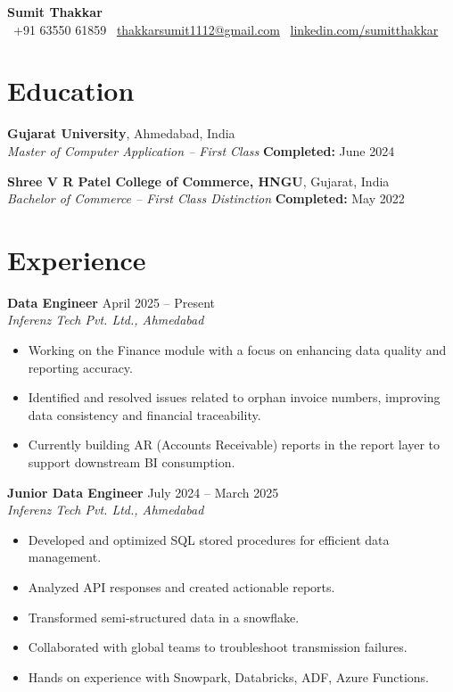 \documentclass[11pt,a4paper]{article}
\begin{document}
\justifying
\begin{center}
  {\Huge \textbf{Sumit Thakkar}}\\[8pt]
  \faPhone \ +91 63550 61859 \quad
  \faEnvelope \ \href{mailto:thakkarsumit1112@gmail.com}{thakkarsumit1112@gmail.com} \quad
  \faLinkedinSquare \ \href{https://linkedin.com/sumitthakkar}{linkedin.com/sumitthakkar}
\end{center}

\vspace{0.5cm}

\section*{Education}

\textbf{Gujarat University}, Ahmedabad, India \\
\textit{Master of Computer Application – First Class} \hfill \textbf{Completed:} June 2024

\vspace{0.3cm}

\textbf{Shree V R Patel College of Commerce, HNGU}, Gujarat, India \\
\textit{Bachelor of Commerce – First Class Distinction} \hfill \textbf{Completed:} May 2022

\vspace{0.4cm}

\section*{Experience}

\textbf{Data Engineer} \hfill April 2025 – Present \\
\textit{Inferenz Tech Pvt. Ltd., Ahmedabad} 
\begin{itemize}
  \item Working on the Finance module with a focus on enhancing data quality and reporting accuracy.
  \item Identified and resolved issues related to orphan invoice numbers, improving data consistency and financial traceability.
  \item Currently building AR (Accounts Receivable) reports in the report layer to support downstream BI consumption.
\end{itemize}

\vspace{0.4cm}

\textbf{Junior Data Engineer} \hfill July 2024 – March 2025 \\
\textit{Inferenz Tech Pvt. Ltd., Ahmedabad} 
\begin{itemize}
  \item Developed and optimized SQL stored procedures for efficient data management.
  \item Analyzed API responses and created actionable reports.
  \item Transformed semi-structured data in a snowflake.
  \item Collaborated with global teams to troubleshoot transmission failures.
  \item Hands on experience with Snowpark, Databricks, ADF, Azure Functions.
\end{itemize}
\end{document}
